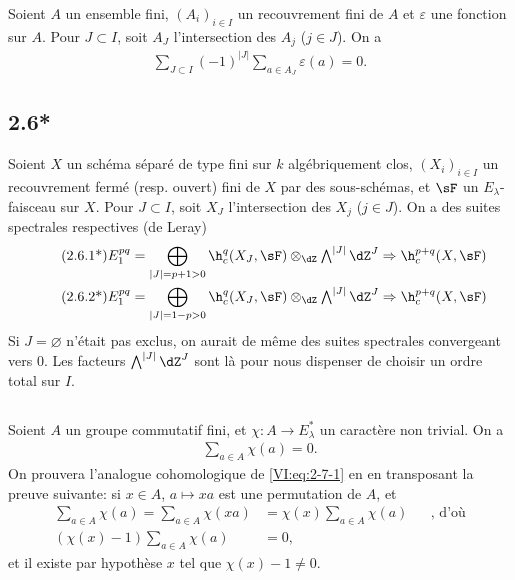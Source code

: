 Soient $A$ un ensemble fini, $(A_i)_{i\in I}$ un recouvrement fini de $A$ et 
$\varepsilon$ une fonction sur $A$. Pour $J\subset I$, soit $A_J$ 
l'intersection des $A_j$ ($j\in J$). On a 
\begin{align*}\tag{2.6.1}\label{VI:eq:2-6-1}
  \sum_{J\subset I} (-1)^{|J|} \sum_{a\in A_J} \varepsilon(a) = 0 \text{.}
\end{align*}





\subsection*{2.6*}\label{VI:2-6*}

Soient $X$ un schéma séparé de type fini sur $k$ algébriquement clos, 
$(X_i)_{i\in I}$ un recouvrement fermé (resp. ouvert) fini de $X$ par des 
sous-schémas, et $\sF$ un $E_\lambda$-faisceau sur $X$. Pour $J\subset I$, 
soit $X_J$ l'intersection des $X_j$ ($j\in J$). On a des suites spectrales 
respectives (de Leray) 
\begin{align*}\tag{2.6.1*}\label{VI:eq:2-6-1*}
  E_1^{p q} &= \bigoplus_{|J|=p+1>0} \h_c^q(X_J,\sF) \otimes_\dZ \textstyle\bigwedge^{|J|} \dZ^J \Rightarrow \h_c^{p+q}(X,\sF) \\ 
  \tag{2.6.2*}\label{VI:eq:2-6-2*}
  E_1^{p q} &= \bigoplus_{|J|=1-p>0} \h_c^q(X_J,\sF) \otimes_\dZ \textstyle\bigwedge^{|J|} \dZ^J \Rightarrow \h_c^{p+q}(X,\sF)
\end{align*}
Si $J=\varnothing$ n'était pas exclus, on aurait de même des suites 
spectrales convergeant vers $0$. Les facteurs $\bigwedge^{|J|} \dZ^J$ sont là 
pour nous dispenser de choisir un ordre total sur $I$. 





\subsection{}\label{VI:2-7}

Soient $A$ un groupe commutatif fini, et $\chi:A \to E_\lambda^\ast$ un 
caractère non trivial. On a 
\begin{align*}\tag{2.7.1}\label{VI:eq:2-7-1}
  \sum_{a\in A} \chi(a) = 0 \text{.}
\end{align*}
On prouvera l'analogue cohomologique de \eqref{VI:eq:2-7-1} en en transposant 
la preuve suivante: si $x\in A$, $a\mapsto x a$ est une permutation de $A$, et 
\begin{align*}
  \sum_{a\in A}\chi(a) = \sum_{a\in A} \chi(x a) &= \chi(x) \sum_{a\in A} \chi(a) && \text{, d'où} \\
  (\chi(x)-1)\sum_{a\in A}\chi(a) &= 0 \text{,}
\end{align*}
et il existe par hypothèse $x$ tel que $\chi(x)-1\ne 0$. 





